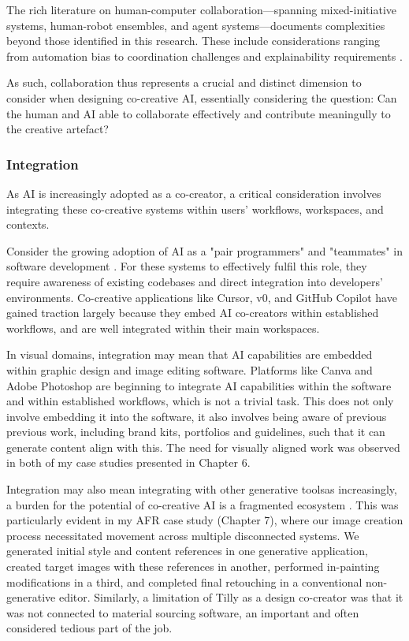 The rich literature on human-computer collaboration—spanning mixed-initiative systems, human-robot ensembles, and agent systems—documents complexities beyond those identified in this research. These include considerations ranging from automation bias to coordination challenges and explainability requirements \cite{Wang2020-cw, Horvitz1999-wh}. 

As such, collaboration thus represents a crucial and distinct dimension to consider when designing co-creative AI, essentially considering the question: Can the human and AI able to collaborate effectively and contribute meaningully to the creative artefact?

\subsubsection{Integration}

As AI is increasingly adopted as a co-creator, a critical consideration involves integrating these co-creative systems within users' workflows, workspaces, and contexts.

Consider the growing adoption of AI as a "pair programmers" and "teammates" in software development \cite{Cursor2024-ow, Ai2025-wi}. For these systems to effectively fulfil this role, they  require awareness of existing codebases and direct integration into developers' environments. Co-creative applications like Cursor, v0, and GitHub Copilot have gained traction largely because they embed AI co-creators within established workflows, and are well integrated within their main workspaces.

In visual domains, integration may mean that AI capabilities are embedded within graphic design and image editing software. Platforms like Canva and Adobe Photoshop are beginning to integrate AI capabilities within the software and within established workflows, which is not a trivial task. This does not only involve embedding it into the software, it also involves being aware of previous previous work, including brand kits, portfolios and guidelines, such that it can generate content align with this. The need for visually aligned work was observed in both of my case studies presented in Chapter 6.

Integration may also mean integrating with other generative toolsas increasingly, a burden for the potential of co-creative AI is a fragmented ecosystem \cite{Palani2024-on}. This was particularly evident in my AFR case study (Chapter 7), where our image creation process necessitated movement across multiple disconnected systems. We generated initial style and content references in one generative application, created target images with these references in another, performed in-painting modifications in a third, and completed final retouching in a conventional non-generative editor. Similarly, a limitation of Tilly as a design co-creator was that it was not connected to material sourcing software, an important and often considered tedious part of the job. 


